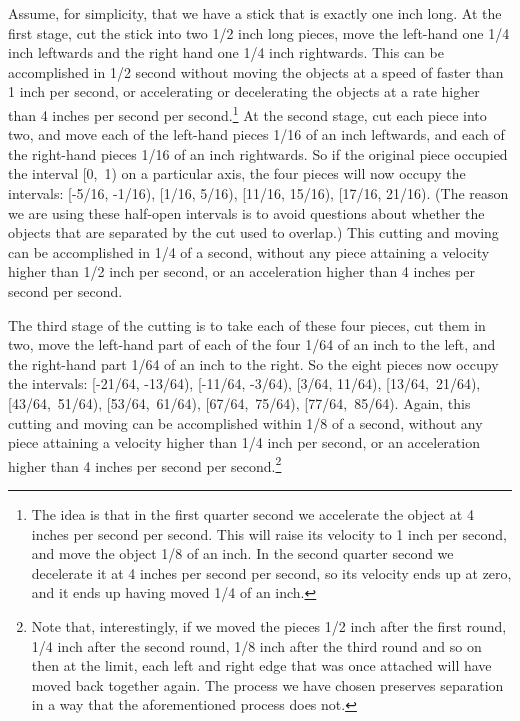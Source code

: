 Assume, for simplicity, that we have a stick that is exactly one inch long. At the first stage, cut the stick into two 1/2 inch long pieces, move the left\nobreakdash-hand one 1/4 inch leftwards and the right hand one 1/4 inch rightwards. This can be accomplished in 1/2 second without moving the objects at a speed of faster than 1 inch per second, or accelerating or decelerating the objects at a rate higher than 4 inches per second per second.\footnote{The idea is that in the first quarter second we accelerate the object at 4 inches per second per second. This will raise its velocity to 1 inch per second, and move the object 1/8 of an inch. In the second quarter second we decelerate it at 4 inches per second per second, so its velocity ends up at zero, and it ends up having moved 1/4 of an inch. } At the second stage, cut each piece into two, and move each of the left\nobreakdash-hand pieces 1/16 of an inch leftwards, and each of the right\nobreakdash-hand pieces 1/16 of an inch rightwards. So if the original piece occupied the interval [0,~1) on a particular axis, the four pieces will now occupy the intervals: [-5/16, -1/16), [1/16, 5/16), [11/16, 15/16), [17/16, 21/16). (The reason we are using these half-open intervals is to avoid questions about whether the objects that are separated by the cut used to overlap.) This cutting and moving can be accomplished in 1/4 of a second, without any piece attaining a velocity higher than 1/2 inch per second, or an acceleration higher than 4 inches per second per second.

The third stage of the cutting is to take each of these four pieces, cut them in two, move the left\nobreakdash-hand part of each of the four 1/64 of an inch to the left, and the right\nobreakdash-hand part 1/64 of an inch to the right. So the eight pieces now occupy the intervals: [-21/64, -13/64), [-11/64, -3/64), [3/64, 11/64), [13/64,~21/64), [43/64,~51/64), [53/64,~61/64), [67/64,~75/64), [77/64,~85/64). Again, this cutting and moving can be accomplished within 1/8 of a second, without any piece attaining a velocity higher than 1/4 inch per second, or an acceleration higher than 4 inches per second per second.\footnote{Note that, interestingly, if we moved the pieces 1/2 inch after the first round, 1/4 inch after the second round, 1/8 inch after the third round and so on then at the limit, each left and right edge that was once attached will have moved back together again. The process we have chosen preserves separation in a way that the aforementioned process does not. }

